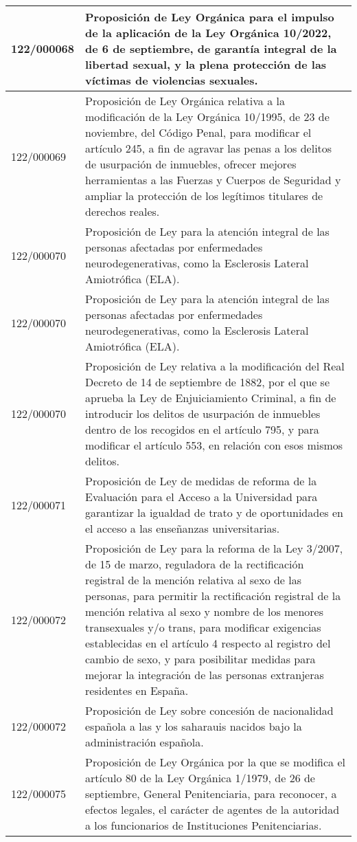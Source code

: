 {\begin{table}[H]
\begin{center}
\begin{tabularx}{\linewidth}{| l | X |}
\hline
122/000068 & Proposición de Ley Orgánica para el impulso de la aplicación de la Ley Orgánica 10/2022, de 6 de septiembre, de garantía integral de la libertad sexual, y la plena protección de las víctimas de violencias sexuales. \\
\hline
122/000069 & Proposición de Ley Orgánica relativa a la modificación de la Ley Orgánica 10/1995, de 23 de noviembre, del Código Penal, para modificar el artículo 245, a fin de agravar las penas a los delitos de usurpación de inmuebles, ofrecer mejores herramientas a las Fuerzas y Cuerpos de Seguridad y ampliar la protección de los legítimos titulares de derechos reales. \\
\hline
122/000070 & Proposición de Ley para la atención integral de las personas afectadas por enfermedades neurodegenerativas, como la Esclerosis Lateral Amiotrófica (ELA). \\
\hline
122/000070 & Proposición de Ley para la atención integral de las personas afectadas por enfermedades neurodegenerativas, como la Esclerosis Lateral Amiotrófica (ELA). \\
\hline
122/000070 & Proposición de Ley relativa a la modificación del Real Decreto de 14 de septiembre de 1882, por el que se aprueba la Ley de Enjuiciamiento Criminal, a fin de introducir los delitos de usurpación de inmuebles dentro de los recogidos en el artículo 795, y para modificar el artículo 553, en relación con esos mismos delitos. \\
\hline
122/000071 & Proposición de Ley de medidas de reforma de la Evaluación para el Acceso a la Universidad para garantizar la igualdad de trato y de oportunidades en el acceso a las enseñanzas universitarias. \\
\hline
122/000072 & Proposición de Ley para la reforma de la Ley 3/2007, de 15 de marzo, reguladora de la rectificación registral de la mención relativa al sexo de las personas, para permitir la rectificación registral de la mención relativa al sexo y nombre de los menores transexuales y/o trans, para modificar exigencias establecidas en el artículo 4 respecto al registro del cambio de sexo, y para posibilitar medidas para mejorar la integración de las personas extranjeras residentes en España. \\
\hline
122/000072 & Proposición de Ley sobre concesión de nacionalidad española a las y los saharauis nacidos bajo la administración española. \\
\hline
122/000075 & Proposición de Ley Orgánica por la que se modifica el artículo 80 de la Ley Orgánica 1/1979, de 26 de septiembre, General Penitenciaria, para reconocer, a efectos legales, el carácter de agentes de la autoridad a los funcionarios de Instituciones Penitenciarias. \\

\end{tabularx}
\end{center}
\end{table}}
